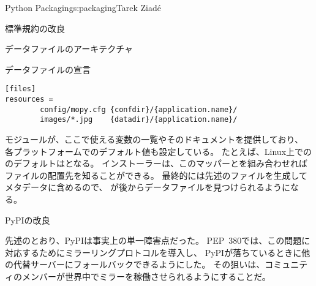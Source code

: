 \begin{aosachapter}{Python Packaging}{s:packaging}{Tarek Ziad\'{e}}
\begin{aosasect1}{標準規約の改良}
\begin{aosasect2}{データファイルのアーキテクチャ}
\begin{aosasect3}{データファイルの宣言}
\begin{verbatim}
[files]
resources =
        config/mopy.cfg {confdir}/{application.name}/
        images/*.jpg    {datadir}/{application.name}/
\end{verbatim}

\noindent
{}モジュールが、ここで使える変数の一覧やそのドキュメントを提供しており、
各プラットフォームでのデフォルト値も設定している。
たとえば、Linux上でののデフォルトはとなる。
インストーラーは、このマッパーとを組み合わせれば
ファイルの配置先を知ることができる。
最終的には先述のファイルを生成してメタデータに含めるので、
が後からデータファイルを見つけられるようになる。


\end{aosasect3}

\end{aosasect2}

\begin{aosasect2}{PyPIの改良}

先述のとおり、PyPIは事実上の単一障害点だった。
PEP~380では、この問題に対応するためにミラーリングプロトコルを導入し、
PyPIが落ちているときに他の代替サーバーにフォールバックできるようにした。
その狙いは、コミュニティのメンバーが世界中でミラーを稼働させられるようにすることだ。



\end{aosasect2}
\end{aosasect1}
\end{aosachapter}
